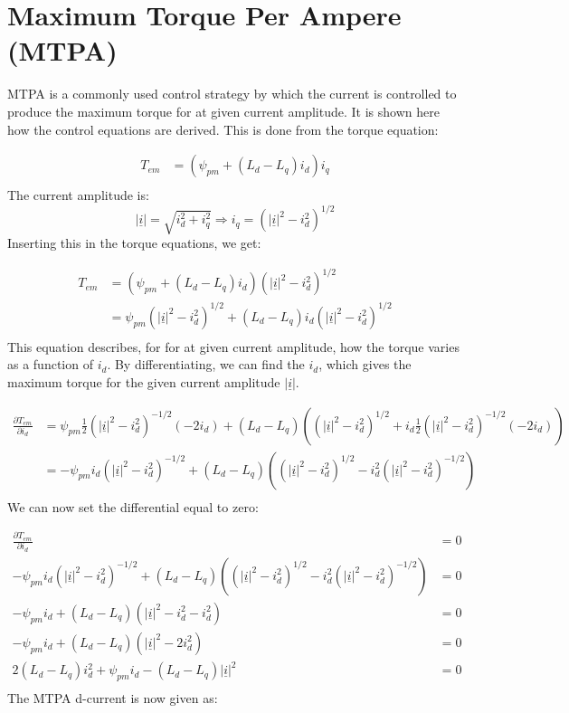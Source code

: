 \documentclass[]{book}
\begin{document}
\hypertarget{maximum-torque-per-ampere-mtpa}{%
\section{Maximum Torque Per Ampere (MTPA)}\label{maximum-torque-per-ampere-mtpa}}

MTPA is a commonly used control strategy by which the current is controlled to produce the maximum torque for at given current amplitude. It is shown here how the control equations are derived. This is done from the torque equation:

\[
\begin{aligned}
T_{em} & =  (\psi_{pm} + (L_d-L_q) i_d)i_q  \\
\end{aligned}
\label{eq:mtpa1}
\]
The current amplitude is:
\[
|\underline{i}| = \sqrt{i^2_d + i^2_q} \Rightarrow  i_q =  (|\underline{i}|^2 - i^2_d)^{1/2} 
\label{eq:mtpa2}
\]
Inserting this in the torque equations, we get:

\[
\begin{aligned}
T_{em} & =  (\psi_{pm} + (L_d-L_q) i_d)(|\underline{i}|^2 - i^2_d)^{1/2}  \\
 & =  \psi_{pm}(|\underline{i}|^2 - i^2_d)^{1/2} + (L_d-L_q) i_d(|\underline{i}|^2 - i^2_d)^{1/2}  \\
\end{aligned}
\label{eq:mtpa3}
\]
This equation describes, for for at given current amplitude, how the torque varies as a function of \(i_d\). By differentiating, we can find the \(i_d\), which gives the maximum torque for the given current amplitude \(|\underline{i}|\).

\[
\begin{aligned}
\frac{\partial T_{em}}{\partial i_d} & =  \psi_{pm}\frac{1}{2} (|\underline{i}|^2 - i^2_d)^{-1/2} (-2i_d) + 
(L_d-L_q) \left(  (|\underline{i}|^2 - i^2_d)^{1/2}   + i_d \frac{1}{2} (|\underline{i}|^2 - i^2_d)^{-1/2} (-2i_d)  \right)  \\
 & =  -\psi_{pm} i_d (|\underline{i}|^2 - i^2_d)^{-1/2}  + 
(L_d-L_q) \left(  (|\underline{i}|^2 - i^2_d)^{1/2}   - i_d^2  (|\underline{i}|^2 - i^2_d)^{-1/2}   \right)  \\
\end{aligned}
\label{eq:mtpa3}
\]
We can now set the differential equal to zero:

\[
\begin{aligned}
\frac{\partial T_{em}}{\partial i_d} & =  0  \\
-\psi_{pm} i_d (|\underline{i}|^2 - i^2_d)^{-1/2}  + (L_d-L_q) \left(  (|\underline{i}|^2 - i^2_d)^{1/2}   - i_d^2  (|\underline{i}|^2 - i^2_d)^{-1/2}   \right) & = 0 \\
-\psi_{pm} i_d   + (L_d-L_q) \left(  |\underline{i}|^2 - i^2_d   - i_d ^2    \right) & = 0 \\
-\psi_{pm} i_d   + (L_d-L_q) (  |\underline{i}|^2 - 2i^2_d     ) & = 0 \\
 2 (L_d-L_q)i^2_d  +\psi_{pm} i_d   - (L_d-L_q)  |\underline{i}|^2  & = 0 \\
\end{aligned}
\label{eq:mtpa4}
\]
The MTPA d-current is now given as:
\end{document}
